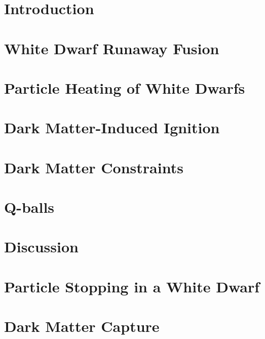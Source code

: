 \documentclass[preprintnumbers,amsmath,amssymb,prd,superscriptaddress]{revtex4}
\begin{document}
\section{Introduction}
\label{sec:intro}


\section{White Dwarf Runaway Fusion}
\label{sec:boomreview}


\section{Particle Heating of White Dwarfs}
\label{sec:smheating}


\section{Dark Matter-Induced Ignition}
\label{sec:dmignition}


\section{Dark Matter Constraints}
\label{sec:constraints}


\section{Q-balls}
\label{sec:qballs}


\section{Discussion}
\label{sec:discussion}


\begin{appendices}
\renewcommand{\thesubsection}{\arabic{subsection}}
\section{Particle Stopping in a White Dwarf}
\label{sec:wdpdg}

\section{Dark Matter Capture}
\label{sec:capture}

\end{appendices}
\end{document}
